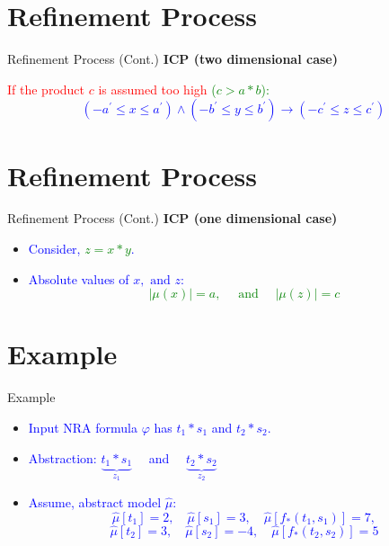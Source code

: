 \documentclass[]{beamer}
\begin{document}
\section{Refinement Process}
\begin{frame}{Refinement Process (Cont.)}
     \textbf{ICP (two dimensional case)}\newline 
     
     \textcolor{red}{If the product $c$ is assumed too high \textcolor{green}{($c > a \ast b$):}}
     \bigskip
     \bigskip
    \textcolor{blue}{$$(-a^\prime \leq x \leq a^\prime) \wedge (-b^\prime \leq y \leq b^\prime) \rightarrow (-c^\prime \leq z \leq c^\prime)$$}
\end{frame}

\section{Refinement Process}
\begin{frame}{Refinement Process (Cont.)}
    \textbf{ICP (one dimensional case)}
    \bigskip
    \bigskip
   \begin{itemize}
   \item \textcolor<1>{blue}{Consider, \textcolor<1>{green}{$z = x*y$}.}
   \item \textcolor<2>{blue}{Absolute values of $x, \text{ and } z$:
\textcolor<2>{green}{$$|\mu(x)| = a, \quad  \text{ and } \quad |\mu(z)| = c$$}}
\end{itemize}
\end{frame}

\section{Example}
\begin{frame}{Example}
    \begin{itemize}
        \item \textcolor<1>{blue}{Input NRA formula $\varphi$ has $t_{1} \ast s_{1}$ and $t_{2} \ast s_{2}$.}
        \bigskip
        \item \textcolor<2>{blue}{Abstraction: \quad $\underbrace{t_{1} \ast s_{1}}\limits_{z_{1}} \quad$ and $\quad \underbrace{t_{2} \ast s_{2}}\limits_{z_{2}}$}
		\item \textcolor<3>{blue}{Assume, abstract model $\hat{\mu}$:
    $$\hat{\mu}[t_{1}] = 2, \quad \hat{\mu}[s_{1}] = 3, \quad \hat{\mu}[f_{\ast}(t_{1}, s_{1})] = 7,$$ $$\hat{\mu}[t_{2}] = 3, \quad \hat{\mu}[s_{2}] = -4, \quad \hat{\mu}[f_{\ast}(t_{2}, s_{2})] = 5$$}
    \end{itemize}
\end{frame}
\end{document}
